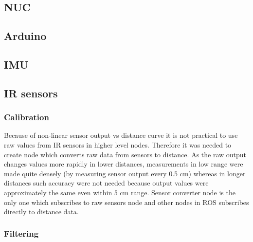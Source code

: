 \subsection{NUC}
\subsection{Arduino}
\subsection{IMU}
\subsection{IR sensors}
\subsubsection{Calibration}

Because of non-linear sensor output vs distance curve it is not practical to use raw values from IR sensors in higher level nodes. Therefore it was needed to create node which converts raw data from sensors to distance. As the raw output changes values more rapidly in lower distances, measurements in low range were made quite densely (by measuring sensor output every 0.5 cm) whereas in longer distances such accuracy were not needed because output values were approximately the same even within 5 cm range. Sensor converter node is the only one which subscribes to raw sensors node and other nodes in ROS subscribes directly to distance data.

\subsubsection{Filtering}